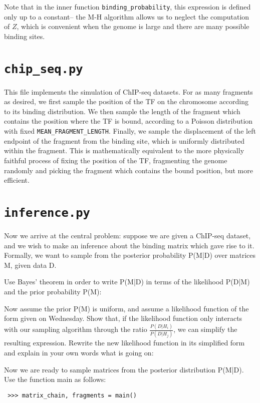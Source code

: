 \documentclass[11pt]{article}
\begin{document}
  Note that in the inner function \texttt{binding\_probability}, this
  expression is defined only up to a constant-- the M-H algorithm
  allows us to neglect the computation of $Z$, which is convenient
  when the genome is large and there are many possible binding sites.
\section{\texttt{chip\_seq.py}}
\label{sec-7}


  This file implements the simulation of ChIP-seq datasets.  For as
  many fragments as desired, we first sample the position of the TF on
  the chromosome according to its binding distribution.  We then
  sample the length of the fragment which contains the position where
  the TF is bound, according to a Poisson distribution with fixed
  \texttt{MEAN\_FRAGMENT\_LENGTH}.  Finally, we sample the displacement of the
  left endpoint of the fragment from the binding site, which is
  uniformly distributed within the fragment.  This is mathematically
  equivalent to the more physically faithful process of fixing the
  position of the TF, fragmenting the genome randomly and picking the
  fragment which contains the bound position, but more efficient.
\section{\texttt{inference.py}}
\label{sec-8}


  Now we arrive at the central problem: suppose we are given a
  ChIP-seq dataset, and we wish to make an inference about the binding
  matrix which gave rise to it.  Formally, we want to sample from the
  posterior probability P(M|D) over matrices M, given data D.  

  Use Bayes' theorem in order to write P(M|D) in terms of the
  likelihood P(D|M) and the prior probability P(M):


  Now assume the prior P(M) is uniform, and assume a likelihood
  function of the form given on Wednesday.  Show that, if the
  likelihood function only interacts with our sampling algorithm
  through the ratio $\frac{P(D|H_i)}{P(D|H_j)}$, we can simplify the
  resulting expression.  Rewrite the new likelihood function in its
  simplified form and explain in your own words what is going on:

  Now we are ready to sample matrices from the posterior distribution
  P(M|D).  Use the function main as follows:

\begin{verbatim}
 >>> matrix_chain, fragments = main()
\end{verbatim}
\end{document}
